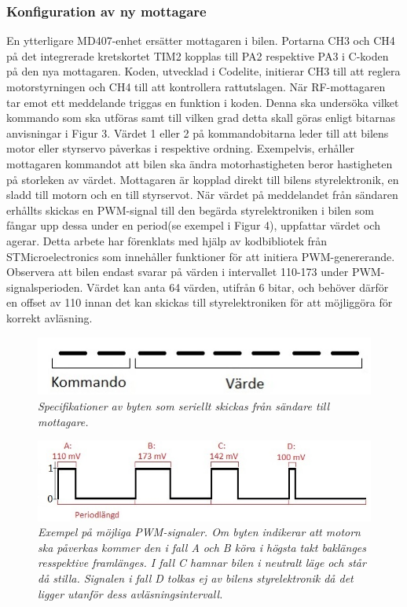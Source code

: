 \documentclass[a4paper]{article}
\begin{document}
\subsubsection{Konfiguration av ny mottagare}
\vspace{5mm} \noindent
En ytterligare MD407-enhet ersätter mottagaren i bilen. Portarna CH3 och CH4 på det integrerade kretskortet TIM2 kopplas till PA2 respektive PA3 i C-koden på den nya mottagaren. Koden, utvecklad i Codelite, initierar CH3 till att reglera motorstyrningen och CH4 till att kontrollera rattutslagen. När RF-mottagaren tar emot ett meddelande triggas en funktion i koden. Denna ska undersöka vilket kommando som ska utföras samt till vilken grad detta skall göras enligt bitarnas anvisningar i Figur 3. Värdet 1 eller 2 på kommandobitarna leder till att bilens motor eller styrservo påverkas i respektive ordning. Exempelvis, erhåller mottagaren kommandot att bilen ska ändra motorhastigheten beror hastigheten på storleken av värdet. Mottagaren är kopplad direkt till bilens styrelektronik, en sladd till motorn och en till styrservot. När värdet på meddelandet från sändaren erhållts skickas en PWM-signal till den begärda styrelektroniken i bilen som fångar upp dessa under en period(se exempel i Figur 4), uppfattar värdet och agerar. Detta arbete har förenklats med hjälp av kodbibliotek från STMicroelectronics som innehåller funktioner för att initiera PWM-genererande. Observera att bilen endast svarar på värden i intervallet 110-173 under PWM-signalsperioden. Värdet kan anta 64 värden, utifrån 6 bitar, och behöver därför en offset av 110 innan det kan skickas till styrelektroniken för att möjliggöra för korrekt avläsning.



\begin{figure}[H]
\includegraphics[scale=1]{aByteComVal.jpg}
\centering
\caption{\it Specifikationer av byten som seriellt skickas från sändare till mottagare.}
\end{figure} 


\begin{figure}[H]
\includegraphics[scale=1]{PWMsignals.jpg}
\centering
\caption{\it Exempel på möjliga PWM-signaler. Om byten indikerar att motorn ska påverkas kommer den i fall A och B köra i högsta takt baklänges resspektive framlänges. I fall C hamnar bilen i neutralt läge och står då stilla. Signalen i fall D tolkas ej av bilens styrelektronik då det ligger utanför dess avläsningsintervall.}
\end{figure} 
\end{document}
